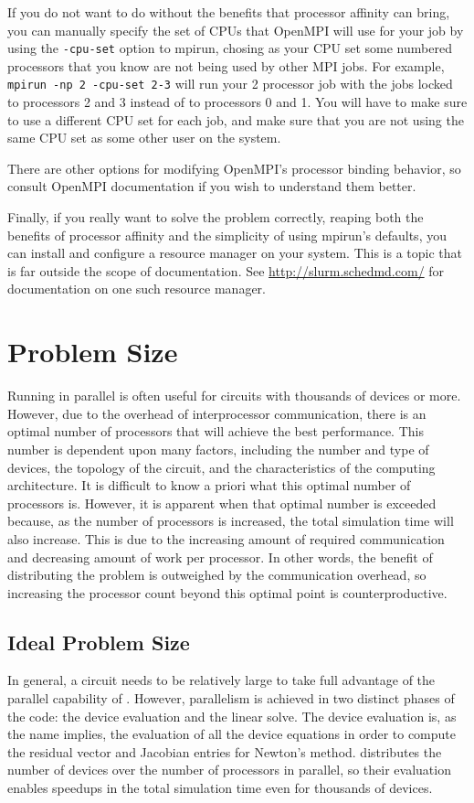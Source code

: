 If you do not want to do without the benefits that processor affinity
can bring, you can manually specify the set of CPUs that OpenMPI will
use for your job by using the \texttt{-cpu-set} option to mpirun,
chosing as your CPU set some numbered processors that you know are not
being used by other MPI jobs.  For example, \texttt{mpirun -np 2
  -cpu-set 2-3} will run your 2 processor job with the jobs locked to
processors 2 and 3 instead of to processors 0 and 1.  You will have to
make sure to use a different CPU set for each job, and make sure that
you are not using the same CPU set as some other user on the system.

There are other options for modifying OpenMPI's processor binding
behavior, so consult OpenMPI documentation if you wish to understand
them better.

Finally, if you really want to solve the problem correctly, reaping
both the benefits of processor affinity and the simplicity of using
mpirun's defaults, you can install and configure a resource manager on
your system.  This is a topic that is far outside the scope of \Xyce{}
documentation.  See \url{http://slurm.schedmd.com/} for documentation
on one such resource manager.


\section{Problem Size}
\label{ProblemSize_Guidance}

Running \Xyce{} in parallel is often useful for circuits with thousands of devices or more.  However, due to the overhead of interprocessor communication,
 there is an optimal number of processors that will achieve the best performance.  This number is dependent upon many factors, including the number and 
type of devices, the topology of the circuit, and the characteristics of the computing architecture.  It is difficult to know a priori what this optimal 
number of processors is.  However, it is apparent when that optimal number is exceeded because, as the number of processors is increased, 
the total simulation time will also increase.  This is due to the increasing amount of required communication and decreasing amount of work per processor.
In other words, the benefit of distributing the problem is outweighed by the communication overhead, so increasing the processor count beyond this
optimal point is counterproductive.

\subsection{Ideal Problem Size}
In general, a circuit needs to be relatively large to take full advantage of the parallel capability of \Xyce{}. 
However, parallelism is achieved in two distinct phases of the code:  the device evaluation and the linear solve.
The device evaluation is, as the name implies, the evaluation of all the device equations in order to compute the residual vector 
and Jacobian entries for Newton's method.  \Xyce{} distributes the number of devices over the number of processors in parallel, 
so their evaluation enables speedups in the total simulation time even for thousands of devices. 

